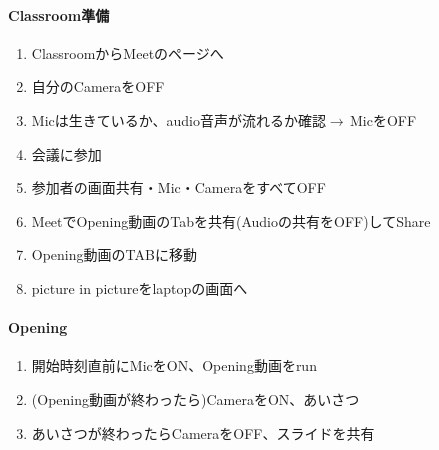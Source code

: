 \documentclass[12pt, jafontscale=0.9247]{jlreq}
\begin{document}
\paragraph{Classroom準備}
\begin{enumerate}
  \item ClassroomからMeetのページへ
  \item 自分のCameraをOFF
  \item Micは生きているか、audio音声が流れるか確認$\longrightarrow$\,MicをOFF
  \item 会議に参加
  \item 参加者の画面共有・Mic・CameraをすべてOFF
  \item MeetでOpening動画のTabを共有(Audioの共有をOFF)してShare
  \item Opening動画のTABに移動
  \item picture in pictureをlaptopの画面へ
\end{enumerate}

\paragraph{Opening}
\begin{enumerate}
  \item 開始時刻直前にMicをON、Opening動画をrun
  \item (Opening動画が終わったら)CameraをON、あいさつ
  \item あいさつが終わったらCameraをOFF、スライドを共有
\end{enumerate}
\end{document}
